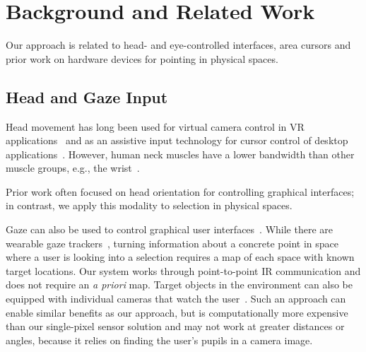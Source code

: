 \section{Background and Related Work}
Our approach is related to head- and eye-controlled interfaces, area cursors and prior work on hardware devices for pointing in physical spaces.

\subsection{Head and Gaze Input}
Head movement has long been used for virtual camera control in VR applications~\cite{pausch_user_1993} and as an assistive input technology for cursor control of desktop applications~\cite{radwin1990method}. However, human neck muscles have a lower bandwidth than other muscle groups, e.g., the wrist~\cite{card_morphological_1991}.


Prior work often focused on head orientation for controlling graphical interfaces; in contrast, we apply this modality to selection in physical spaces.

Gaze can also be used to control graphical user interfaces~\cite{kumar2007eyepoint}. While there are wearable gaze trackers~\cite{bulling2009wearable}, turning information about a concrete point in space where a user is looking into a selection requires a map of each space with known target locations. Our system works through point-to-point IR communication and does not require an {\em a priori} map. Target objects in the environment can also be equipped with individual cameras that watch the user~\cite{smith2013gaze,vertegaal2005media}. Such an approach can enable similar benefits as our approach, but is computationally more expensive than our single-pixel sensor solution and may not work at greater distances or angles, because it relies on finding the user's pupils in a camera image.



